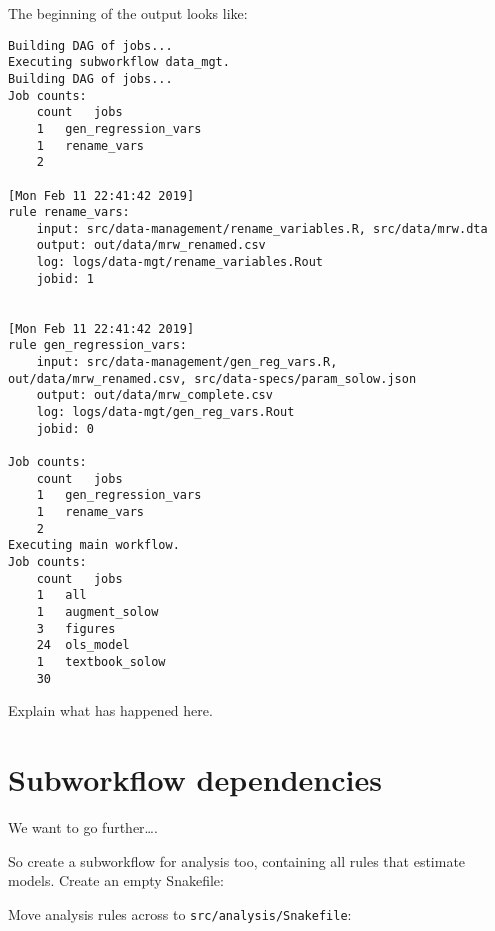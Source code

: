 \documentclass[]{book}
\newenvironment{Shaded}{\begin{snugshade}}{\end{snugshade}}
\newcommand{\KeywordTok}[1]{\textcolor[rgb]{0.13,0.29,0.53}{\textbf{{#1}}}}
\newcommand{\NormalTok}[1]{{#1}}
\theoremstyle{definition}
\theoremstyle{definition}
\theoremstyle{definition}
\theoremstyle{remark}
\begin{document}
\begin{Shaded}
\end{Shaded}

The beginning of the output looks like:

\begin{verbatim}
Building DAG of jobs...
Executing subworkflow data_mgt.
Building DAG of jobs...
Job counts:
    count   jobs
    1   gen_regression_vars
    1   rename_vars
    2

[Mon Feb 11 22:41:42 2019]
rule rename_vars:
    input: src/data-management/rename_variables.R, src/data/mrw.dta
    output: out/data/mrw_renamed.csv
    log: logs/data-mgt/rename_variables.Rout
    jobid: 1


[Mon Feb 11 22:41:42 2019]
rule gen_regression_vars:
    input: src/data-management/gen_reg_vars.R, out/data/mrw_renamed.csv, src/data-specs/param_solow.json
    output: out/data/mrw_complete.csv
    log: logs/data-mgt/gen_reg_vars.Rout
    jobid: 0

Job counts:
    count   jobs
    1   gen_regression_vars
    1   rename_vars
    2
Executing main workflow.
Job counts:
    count   jobs
    1   all
    1   augment_solow
    3   figures
    24  ols_model
    1   textbook_solow
    30
\end{verbatim}

Explain what has happened here.

\section{Subworkflow dependencies}\label{subworkflow-dependencies}

We want to go further\ldots{}.

So create a subworkflow for analysis too, containing all rules that
estimate models. Create an empty Snakefile:

\begin{Shaded}
\end{Shaded}

Move analysis rules across to \texttt{src/analysis/Snakefile}:
\end{document}
